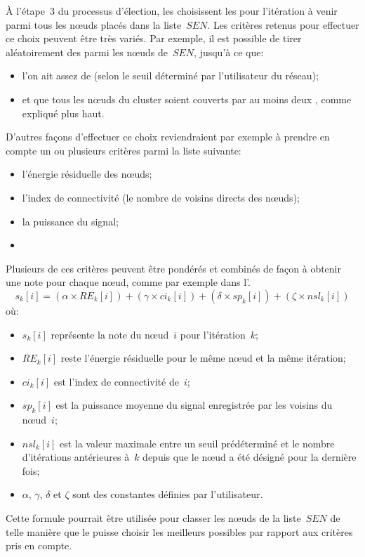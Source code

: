 À l'étape~3 du processus d'élection, les \chs choisissent les \cns pour l'itération à venir parmi tous les nœuds placés dans la liste~$SEN$.
Les critères retenus pour effectuer ce choix peuvent être très variés.
Par exemple, il est possible de tirer aléatoirement des \cns parmi les nœuds de~$SEN$, jusqu'à ce que:
\begin{itemize}
    \item l'on ait assez de \cns (selon le seuil déterminé par l'utilisateur du réseau);
    \item et que tous les nœuds du cluster soient couverts par au moins deux \cns, comme expliqué plus haut.
\end{itemize}
D'autres façons d'effectuer ce choix reviendraient par exemple à prendre en compte un ou plusieurs critères parmi la liste suivante:
\begin{itemize}
    \item l'énergie résiduelle des nœuds;
    \item l'index de connectivité (le nombre de voisins directs des nœuds);
    \item la puissance du signal;
    \item \etc
\end{itemize}
Plusieurs de ces critères peuvent être pondérés et combinés de façon à obtenir une note pour chaque nœud, comme par exemple dans l'.
\begin{equation}
    \label{se:eqn:score}
    s_k[i] = (\alpha \times RE_k[i]) + (\gamma \times ci_k[i]) + (\delta \times sp_k[i]) + (\zeta \times nsl_k[i])
\end{equation}
où:
\begin{itemize}
    \item $s_k[i]$ représente la note du nœud~$i$ pour l'itération~$k$;
    \item $RE_k[i]$ reste l'énergie résiduelle pour le même nœud et la même itération;
    \item $ci_k[i]$ est l'index de connectivité de~$i$;
    \item $sp_k[i]$ est la puissance moyenne du signal enregistrée par les voisins du nœud~$i$;
    \item $nsl_k[i]$ est la valeur maximale entre un seuil prédéterminé et le nombre d'itérations antérieures à~$k$ depuis que le nœud a été désigné \cn pour la dernière fois;
    \item $\alpha$, $\gamma$, $\delta$ et $\zeta$ sont des constantes définies par l'utilisateur.
\end{itemize}
Cette formule pourrait être utilisée pour classer les nœuds de la liste~$SEN$ de telle manière que le \ch puisse choisir les meilleurs \cns possibles par rapport aux critères pris en compte.

